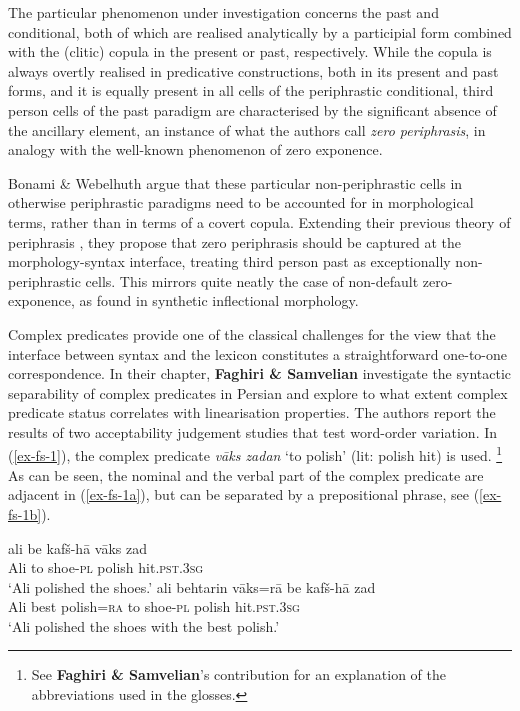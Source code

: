 \documentclass[output=paper]{langscibook}
\begin{document}
The particular phenomenon under investigation concerns the past and
conditional, both of which are realised analytically by a participial
form combined with the (clitic) copula in the present or past,
respectively. While the copula is always overtly realised in
predicative constructions, both in its present and past forms, and it
is equally present in all cells of the periphrastic conditional, third
person cells of the past paradigm are characterised by the significant
absence of the ancillary element, an instance of what the authors call
\textit{zero periphrasis}, in analogy with the well-known phenomenon
of zero exponence. 

Bonami \& Webelhuth argue that these particular non-periphrastic
cells in otherwise periphrastic paradigms need to be accounted for in
morphological terms, rather than in terms of a covert copula.
Extending their previous theory of periphrasis
\citep{Bonami14d,Bonami16b,Bonami13}, they propose that zero
periphrasis should be captured at the morphology-syntax interface,
treating third person past as exceptionally non-periphrastic
cells. This mirrors quite neatly the case of non-default
zero-exponence, as found in synthetic inflectional morphology. 

\medskip

Complex predicates provide one of the classical challenges for the
view that the interface between syntax and the lexicon constitutes a
straightforward one-to-one correspondence. In their chapter,
\textbf{Faghiri \& Samvelian} investigate the syntactic separability
of complex predicates in Persian and explore to what extent complex
predicate status correlates with linearisation properties.  The
authors report the results of two acceptability judgement studies that test
word-order variation. In (\ref{ex-fs-1}), the complex predicate
\textit{v\={a}ks zadan} `to polish' (lit: polish hit) is used.%
\footnote{See \textbf{Faghiri \& Samvelian}'s contribution for an
  explanation of the abbreviations used in the glosses.} %
As can be seen, the nominal and the verbal part of the complex
predicate are adjacent in (\ref{ex-fs-1a}), but can be separated by a
prepositional phrase, see (\ref{ex-fs-1b}).

\ea \label{ex-fs-1}
\begin{xlist}
\ex 
\gll ali be kaf\v{s}-h\={a} v\={a}ks zad\\
Ali to shoe-\textsc{pl} polish hit.\textsc{pst.3sg}\\
\glt `Ali polished the shoes.'\label{ex-fs-1a}
\ex
\gll ali behtarin v\={a}ks=r\={a} be kaf\v{s}-h\={a}  zad\\
Ali best polish=\textsc{ra} to shoe-\textsc{pl} polish hit.\textsc{pst.3sg}\\
\glt `Ali polished the shoes with the best polish.'
\label{ex-fs-1b}
\end{xlist}
\z 
\end{document}
